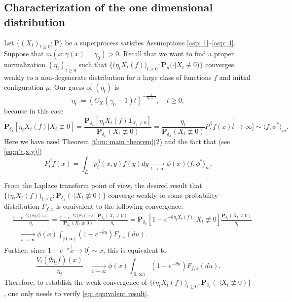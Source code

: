 \documentclass[12pt, a4paper]{amsart}
\theoremstyle{definition}
\numberwithin{equation}{section}
\begin{document}
\subsection{Characterization of the one dimensional distribution}
\label{sec: conditional distribution}
	Let $\{(X_t)_{t\geq 0}; \mathbf P\}$ be a superprocess satisfies
	Assumptions \ref{asp: 1}--\ref{asp: 4}.
	Suppose that $m(x: \gamma(x) = \gamma_0)>0$.
	Recall that we want to find a proper normalization $(\eta_t)_{t\geq 0}$ such that $\big\{\big(\eta_t X_t(f))_{t \geq 0}; \mathbf P_\mu(\cdot | X_t \not \equiv 0\big)\big\}$
	converges weakly
	to a non-degenerate distribution for a large class of functions $f$ and initial configuration $\mu$.
	Our guess of $(\eta_t)$ is
\[\label{eq: definition of eta}
	\eta_t
	:= (C_X(\gamma_0 - 1) t)^{-\frac{1}{\gamma_0 - 1}},
	\quad t\geq 0,
\]
	because in this case 
 \[
 	\mathbf P_{\delta_x}[\eta_t X_t(f)|X_t \not \equiv 0]
	= \frac{\mathbf P_{\delta_x}[\eta_t X_t(f) \mathbf 1_{X_t \not \equiv 0}]} {\mathbf P_{\delta_x}(X_t \not \equiv 0) }
	= \frac{\eta_t}{\mathbf P_{\delta_x}(X_t \not \equiv 0)} P^\beta_t f(x)
	\stackrel[t\to \infty]{}{\sim}  \langle f,\phi^* \rangle_m.
 \]
 	Here we have used Theorem \ref{thm: main theorem}(2) and the fact that (see \eqref{eq:q(t,x,y)})
 \[
 	P^\beta_t f(x)
 	= \int_E p_t^\beta(x,y)f(y)dy
 	\xrightarrow[t\to \infty]{}  \phi(x) \langle f,\phi^*\rangle_m.
 \]
 	
 	From the Laplace transform point of view, the desired result that $\big\{\big(\eta_t X_t(f)\big)_{t \geq 0}; \mathbf P_{\delta_x}(\cdot | X_t \not \equiv 0)\big\}$
 converge weakly 
 	to some probability distribution $F_{f,x}$ is equivalent to the following convergence:
\[\begin{split}
 	&\frac{1-e^{- V_t(\theta \eta_t f)(x)}}{\eta_t}
	= \frac{1-e^{- V_t(\theta \eta_t f)(x)}}{\mathbf P_{\delta_x}(X_t \not \equiv 0)} \frac{ \mathbf P_{\delta_x}(X_t \not \equiv 0) } { \eta_t }
	= \mathbf P_{\delta_x}[1-e^{-\theta \eta_t X_t(f)}| X_t \not \equiv 0]  \frac{ \mathbf P_{\delta_x}(X_t \not \equiv 0) } { \eta_t }
	\\&\quad \xrightarrow[t\to \infty]{} \phi(x) \int_{[0,\infty)}(1-e^{-\theta u})F_{f,x}(du).
\end{split}\]
	Further, since $1-e^{-x} \stackrel[x\to 0]{}{\sim} x$, this is equivalent to
\[\label{eq: equivalent result}
	\frac{V_t(\theta \eta_t f)(x)}{\eta_t}
	\quad \xrightarrow[t\to \infty]{} \phi(x) \int_{[0,\infty)}(1-e^{-\theta u})F_{f,x}(du).
\]
	Therefore, to 
	establish the weak convergence of $\big\{\big(\eta_t X_t(f)\big)_{t \geq 0}; \mathbf P_{\delta_x}(\cdot | X_t \not \equiv 0)\big\}$, one only needs to verify \eqref{eq: equivalent result}.
	
\end{document}

